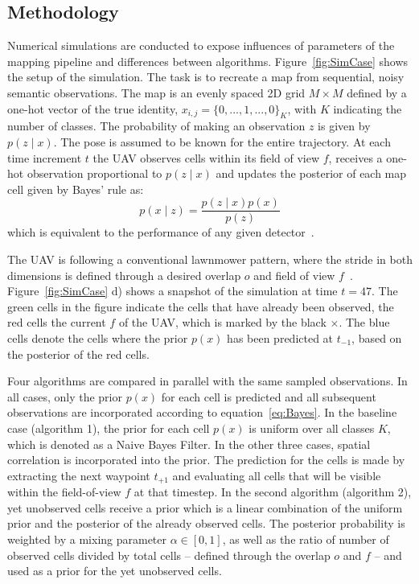 \documentclass[twocolumn,letterpaper]{IEEEAerospaceCLS}  %
\begin{document}
\subsection{Methodology} \label{ssec:SimMet}
Numerical simulations are conducted to expose influences of parameters of the mapping pipeline and differences between algorithms. Figure~\ref{fig:SimCase} shows the setup of the simulation. The task is to recreate a map from sequential, noisy semantic observations. The map is an evenly spaced 2D grid $M \times M$ defined by a one-hot vector of the true identity, $x_{i,j} = \{0,..., 1, ..., 0\}_K$, with $K$ indicating the number of classes. The probability of making an observation $z$ is given by $p(z\mid x)$. The pose is assumed to be known for the entire trajectory. At each time increment $t$ the UAV observes cells within its field of view $f$, receives a one-hot observation proportional to $p(z\mid x)$ and updates the posterior of each map cell given by Bayes' rule as:
\begin{equation} \label{eq:Bayes}
    p(x\mid z) = \frac{p(z\mid x) p(x)}{p(z)}
\end{equation}
which is equivalent to the performance of any given detector~\cite{alom_history_2018}.

The UAV is following a conventional lawnmower pattern, where the stride in both dimensions is defined through a desired overlap $o$ and field of view $f$~\cite{shetty_implementation_2020}. Figure~\ref{fig:SimCase} d) shows a snapshot of the simulation at time $t=47$. The green cells in the figure indicate the cells that have already been observed, the red cells the current $f$ of the UAV, which is marked by the black $\pmb{\times}$. The blue cells denote the cells where the prior $p(x)$ has been predicted at $t_{-1}$, based on the posterior of the red cells.

Four algorithms are compared in parallel with the same sampled observations. In all cases, only the prior $p(x)$ for each cell is predicted and all subsequent observations are incorporated according to equation~\ref{eq:Bayes}. In the baseline case (algorithm 1), the prior for each cell $p(x)$ is uniform over all classes $K$, which is denoted as a Naive Bayes Filter. In the other three cases, spatial correlation is incorporated into the prior. The prediction for the cells is made by extracting the next waypoint $t_{+1}$ and evaluating all cells that will be visible within the field-of-view $f$ at that timestep. In the second algorithm (algorithm 2), yet unobserved cells receive a prior which is a linear combination of the uniform prior and the posterior of the already observed cells. The posterior probability is weighted by a mixing parameter $\alpha \in [0, 1]$, as well as the ratio of number of observed cells divided by total cells -- defined through the overlap $o$ and $f$ -- and used as a prior for the yet unobserved cells.
\end{document}
